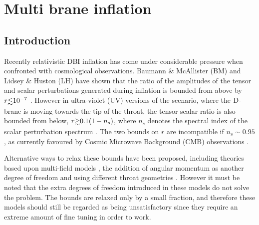 \renewcommand{\CVSrevision}{\version$Id: multibrane.tex,v 1.38 2009/09/27 16:16:30 ith Exp $}

\chapter{Multi brane inflation}
\label{ch:multibrane}

\section{Introduction}
\label{sec:intro-multi}


Recently relativistic DBI inflation has come under considerable 
pressure when confronted with cosmological observations.  
Baumann \& McAllister (BM) and Lidsey \& Huston (LH) 
have shown that the ratio of the amplitudes of the 
tensor and scalar perturbations generated during 
inflation is bounded from above by $r \lsim 10^{-7}$
\cite{bmpaper,lidseyhuston}. 
However in ultra-violet (UV) versions of the scenario, where 
the ${\rm D}$-brane is moving towards the tip of the throat, the tensor-scalar 
ratio is also bounded from below, $r \gsim 0.1 (1-n_s)$, 
where $n_s$ denotes the spectral index 
of the scalar perturbation spectrum \cite{lidseyhuston}. 
The two bounds on $r$ are incompatible 
if $n_s \sim 0.95$, as currently favoured by Cosmic Microwave Background 
(CMB) observations \cite{spergel,Komatsu:2008hk}. 





Alternative ways to relax these bounds have been proposed, including
theories based upon multi-field models \cite{Huang:2007hh}, the addition of
angular momentum as another degree of freedom \cite{spinflation} and using
different throat geometries \cite{Gmeiner:2007uw}. However it must be noted that
the extra degrees of freedom introduced in these models do not solve the problem. The 
bounds are relaxed only by a small fraction, and therefore these models should still be 
regarded as being unsatisfactory since they require an extreme amount of fine tuning in order
to work.


